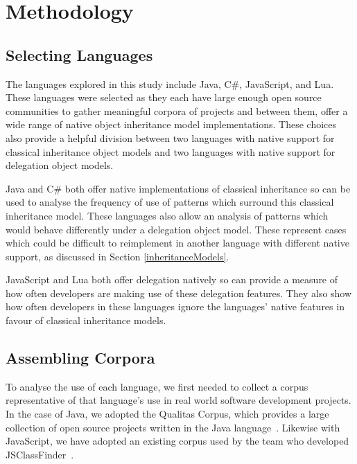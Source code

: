 \chapter{Methodology}\label{C:method} 

\section{Selecting Languages}
The languages explored in this study include Java, C\#, JavaScript, and Lua. These languages were selected as they each have large enough open source communities to gather meaningful corpora of projects and between them, offer a wide range of native object inheritance model implementations. These choices also provide a helpful division between two languages with native support for classical inheritance object models and two languages with native support for delegation object models.
\newline

Java and C\# both offer native implementations of classical inheritance so can be used to analyse the frequency of use of patterns which surround this classical inheritance model. These languages also allow an analysis of patterns which would behave differently under a delegation object model. These represent cases which could be difficult to reimplement in another language with different native support, as discussed in Section \ref{inheritanceModels}.
\newline

JavaScript and Lua both offer delegation natively so can provide a measure of how often developers are making use of these delegation features. They also show how often developers in these languages ignore the languages' native features in favour of classical inheritance models.

\section{Assembling Corpora}
To analyse the use of each language, we first needed to collect a corpus representative of that language's use in real world software development projects. In the case of Java, we adopted the Qualitas Corpus, which provides a large collection of open source projects written in the Java language~\cite{QualitasCorpus}. Likewise with JavaScript, we have adopted an existing corpus used by the team who developed JSClassFinder~\cite{JSClassFinder}.
\newline

